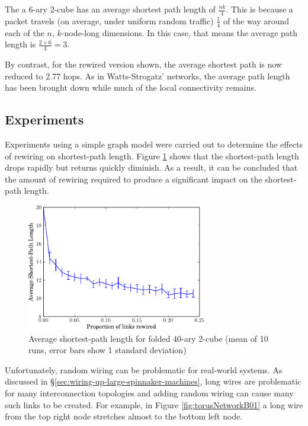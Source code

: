 			The a 6-ary 2-cube has an average shortest path length of $\frac{nk}{4}$.
			This is because a packet travels (on average, under uniform random
			traffic) $\frac{1}{4}$ of the way around each of the $n$, $k$-node-long
			dimensions. In this case, that means the average path length is $\frac{2
			\times 6}{4} = 3$.
			
			By contrast, for the rewired version shown, the average shortest path is
			now reduced to 2.77 hops. As in Watts-Strogatz' networks, the average path
			length has been brought down while much of the local connectivity remains.
		
		
		\subsection{Experiments}
			
			Experiments using a simple graph model were carried out to determine the
			effects of rewiring on shortest-path length. Figure
			\ref{fig:smallWorldTorus} shows that the shortest-path length drops
			rapidly but returns quickly diminish. As a result, it can be concluded
			that the amount of rewiring required to produce a significant impact on
			the shortest-path length.
			
			\begin{figure}
				\center
				\includegraphics[width=0.7\textwidth]{figures/smallWorldTorus}
				\caption[Average shortest-path length for folded 40-ary 2-cube]{Average
				shortest-path length for folded 40-ary 2-cube (mean of 10 runs, error
				bars show 1 standard deviation)}
				\label{fig:smallWorldTorus}
			\end{figure}
			
			Unfortunately, random wiring can be problematic for real-world systems.
			As discussed in \S\ref{sec:wiring-up-large-spinnaker-machines}, long wires
			are problematic for many interconnection topologies and adding random
			wiring can cause many such links to be created. For example, in Figure
			\ref{fig:torusNetworkB01} a long wire from the top right node stretches
			almost to the bottom left node.
			
